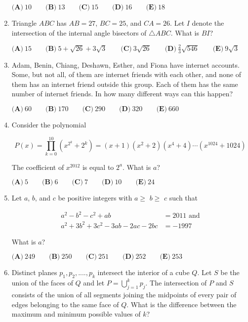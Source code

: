 \documentclass{article}
\begin{document}
\begin{enumerate}[label=\arabic*., itemsep=0.5em]
$ \textbf{(A)}\ 10\qquad\textbf{(B)}\ 13\qquad\textbf{(C)}\ 15\qquad\textbf{(D)}\ 16\qquad\textbf{(E)}\ 18 $\par \vspace{0.5em}\item Triangle $ABC$ has $AB=27$, $BC=25$, and $CA=26$.  Let $I$ denote the intersection of the internal angle bisectors of $\triangle ABC$.  What is $BI$?

$ \textbf{(A)}\ 15\qquad\textbf{(B)}\ 5+\sqrt{26}+3\sqrt{3}\qquad\textbf{(C)}\ 3\sqrt{26}\qquad\textbf{(D)}\ \frac{2}{3}\sqrt{546}\qquad\textbf{(E)}\ 9\sqrt{3} $\par \vspace{0.5em}\item Adam, Benin, Chiang, Deshawn, Esther, and Fiona have internet accounts.  Some, but not all, of them are internet friends with each other, and none of them has an internet friend outside this group.  Each of them has the same number of internet friends.  In how many different ways can this happen?

$ \textbf{(A)}\ 60
\qquad\textbf{(B)}\ 170
\qquad\textbf{(C)}\ 290
\qquad\textbf{(D)}\ 320
\qquad\textbf{(E)}\ 660
 $\par \vspace{0.5em}\item Consider the polynomial


\begin{equation*}
P(x)=\prod_{k=0}^{10}(x^{2^k}+2^k)=(x+1)(x^2+2)(x^4+4)\cdots (x^{1024}+1024)
\end{equation*}


The coefficient of $x^{2012}$ is equal to $2^a$.  What is $a$?

$ \textbf{(A)}\ 5
\qquad\textbf{(B)}\ 6
\qquad\textbf{(C)}\ 7
\qquad\textbf{(D)}\ 10
\qquad\textbf{(E)}\ 24
 $\par \vspace{0.5em}\item Let $a$, $b$, and $c$ be positive integers with $a\ge$ $b\ge$ $c$ such that

\begin{align*}a^{2}-b^{2}-c^{2}+ab&=2011\text{ and}\\
a^{2}+3b^{2}+3c^{2}-3ab-2ac-2bc&=-1997
\end{align*}

What is $a$?

$ \textbf{(A)}\ 249\qquad\textbf{(B)}\ 250\qquad\textbf{(C)}\ 251\qquad\textbf{(D)}\ 252\qquad\textbf{(E)}\ 253 $\par \vspace{0.5em}\item Distinct planes $p_1,p_2,....,p_k$ intersect the interior of a cube $Q$. Let $S$ be the union of the faces of $Q$ and let $ P =\bigcup_{j=1}^{k}p_{j} $. The intersection of $P$ and $S$ consists of the union of all segments joining the midpoints of every pair of edges belonging to the same face of $Q$. What is the difference between the maximum and minimum possible values of $k$?


\end{enumerate}
\end{document}
